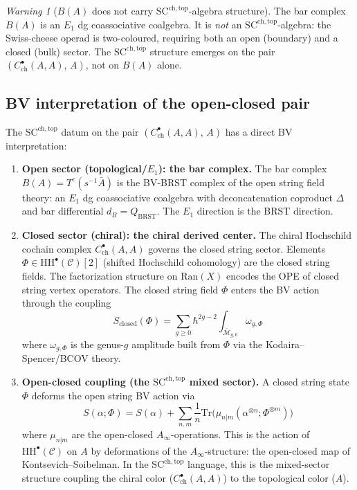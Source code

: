\documentclass[11pt]{amsart}
\theoremstyle{plain}
\theoremstyle{definition}
\theoremstyle{remark}
\newtheorem{warning}[theorem]{Warning}
\newcommand{\Ainf}{A_\infty}
\newcommand{\HH}{\mathrm{HH}}
\newcommand{\Tr}{\mathrm{Tr}}
\newcommand{\Ran}{\mathrm{Ran}}
\newcommand{\BRST}{\mathrm{BRST}}
\newcommand{\SC}{\mathrm{SC}}
\newcommand{\cC}{\mathcal{C}}
\newcommand{\cM}{\mathcal{M}}
\begin{document}
\begin{warning}[$B(A)$ does not carry $\SC^{\mathrm{ch,top}}$-algebra structure]
\label{warn:bar-not-sc}
The bar complex $B(A)$ is an $E_1$ dg coassociative coalgebra. It is \emph{not} an $\SC^{\mathrm{ch,top}}$-algebra: the Swiss-cheese operad is two-coloured, requiring both an open (boundary) and a closed (bulk) sector. The $\SC^{\mathrm{ch,top}}$ structure emerges on the pair $(C^\bullet_{\mathrm{ch}}(A,A),\, A)$, not on $B(A)$ alone.
\end{warning}

\subsection{BV interpretation of the open-closed pair}
\label{subsec:bv-swiss-cheese}

The $\SC^{\mathrm{ch,top}}$ datum on the pair $(C^\bullet_{\mathrm{ch}}(A,A),\, A)$ has a direct BV interpretation:

\begin{enumerate}[label=(\arabic*)]
 \item \textbf{Open sector (topological/$E_1$): the bar complex.} The bar complex $B(A) = T^c(s^{-1}\bar{A})$ is the BV-BRST complex of the open string field theory: an $E_1$ dg coassociative coalgebra with deconcatenation coproduct $\Delta$ and bar differential $d_B = Q_{\BRST}$. The $E_1$ direction is the BRST direction.

 \item \textbf{Closed sector (chiral): the chiral derived center.} The chiral Hochschild cochain complex $C^\bullet_{\mathrm{ch}}(A,A)$ governs the closed string sector. Elements $\Phi \in \HH^\bullet(\cC)[2]$ (shifted Hochschild cohomology) are the closed string fields. The factorization structure on $\Ran(X)$ encodes the OPE of closed string vertex operators. The closed string field $\Phi$ enters the BV action through the coupling
 \[
 S_{\mathrm{closed}}(\Phi) = \sum_{g \geq 0} \hbar^{2g-2} \int_{\overline{\cM}_{g,0}} \omega_{g,\Phi}
 \]
 where $\omega_{g,\Phi}$ is the genus-$g$ amplitude built from $\Phi$ via the Kodaira--Spencer/BCOV theory.

 \item \textbf{Open-closed coupling (the $\SC^{\mathrm{ch,top}}$ mixed sector).} A closed string state $\Phi$ deforms the open string BV action via
 \[
 S(\alpha; \Phi) = S(\alpha) + \sum_{n,m} \frac{1}{n} \Tr\bigl(\mu_{n|m}(\alpha^{\otimes n}; \Phi^{\otimes m})\bigr)
 \]
 where $\mu_{n|m}$ are the open-closed $\Ainf$-operations. This is the action of $\HH^\bullet(\cC)$ on $A$ by deformations of the $\Ainf$-structure: the open-closed map of Kontsevich--Soibelman. In the $\SC^{\mathrm{ch,top}}$ language, this is the mixed-sector structure coupling the chiral color ($C^\bullet_{\mathrm{ch}}(A,A)$) to the topological color ($A$).
\end{enumerate}
\end{document}
